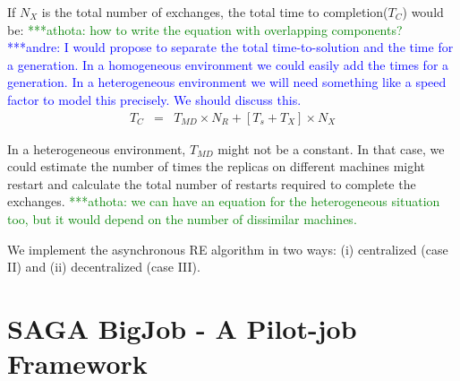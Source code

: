 \documentclass{rspublic}
\newcommand{\alnote}[1]{ {\textcolor{blue} { ***andre: #1 }}}
\newcommand{\athotanote}[1]{ {\textcolor{green} { ***athota: #1 }}}
\newcommand{\alnote}[1]{}
\newcommand{\athotanote}[1]{}
\begin{document}
If $N_{X}$ is the total number of exchanges, the total time to completion($T_{C}$) would be:
\athotanote{how to write the equation with overlapping components?}
\alnote{I would propose to separate the total time-to-solution and the time for a generation. 
In a homogeneous environment we could easily add the times for a generation. In a heterogeneous 
environment we will need something like a speed factor to model this precisely. We should discuss this.}
  \begin{eqnarray}
T_{C} &=& T_{MD} \times N_{R} + [T_{s} + T_{X}] \times N_{X}
\label{eq:equation 1}
\end{eqnarray}

In a heterogeneous environment, $T_{MD}$ might not be a constant. In that case, we could estimate the number of times the replicas on different machines might restart and calculate the total number of restarts required to complete the exchanges. \athotanote{we can have an equation for the heterogeneous situation too, but it would depend on the number of dissimilar machines.}

We implement the asynchronous RE algorithm in two ways: (i) centralized (case II) and (ii) decentralized (case III).




\section{SAGA BigJob - A Pilot-job Framework}
\end{document}
